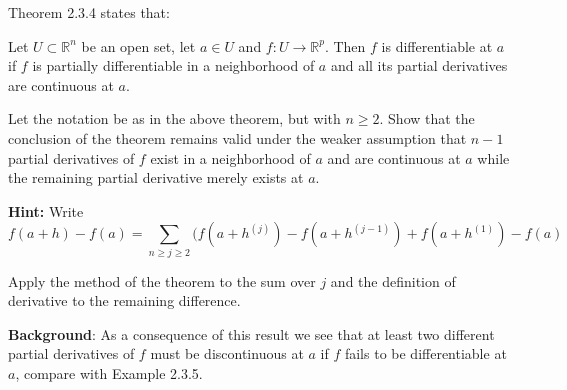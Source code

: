 \begin{exercise}{12}
    Theorem 2.3.4 states that:

    Let $U \subset \mathbb{R}^n$ be an open set, let $a \in U$ and $f: U \rightarrow \mathbb{R}^p$. Then $f$ is differentiable at $a$ if $f$ is partially differentiable in a neighborhood of $a$ and all its partial derivatives are continuous at $a$.

    
    Let the notation be as in the above theorem, but with $n \geq 2$. 
    Show that the conclusion of the theorem remains valid under the weaker assumption that $n - 1$ partial derivatives of $f$ exist in a neighborhood of $a$ and are continuous at $a$ while the remaining partial derivative merely exists at $a$.

    \textbf{Hint:} Write
    $$f(a + h) - f(a) = \sum_{n \geq j \geq 2} (f(a + h^{(j)}) - f(a + h^{(j - 1)}) + f(a + h^{(1)}) - f(a)$$

    Apply the method of the theorem to the sum over $j$ and the definition of derivative to the remaining difference.

    \textbf{Background}: As a consequence of this result we see that at least two different partial derivatives of $f$ must be discontinuous at $a$ if $f$ fails to be differentiable at $a$, compare with Example 2.3.5.
\end{exercise}

